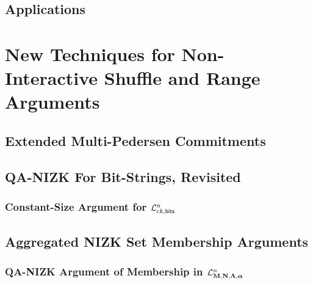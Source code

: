         

    \section{Applications} \label{sec:bits-applications}

        

\chapter{New Techniques for Non-Interactive Shuffle and Range Arguments}

    

    \section{Extended Multi-Pedersen Commitments}

        

    \section{QA-NIZK For Bit-Strings, Revisited}

        

        \subsection{Constant-Size Argument for $\mathcal{L}_{ck,\mathsf{bits}}^n$}

            


    \section{Aggregated NIZK Set Membership Arguments}

        

        \subsection{QA-NIZK Argument of Membership in $\mathcal{L}_{\mathbf{{M}},\mathbf{{N}},\mathbf{{\Lambda}},{\boldsymbol \alpha}}^n$} \label{sec:bin-lan-constr}

            

